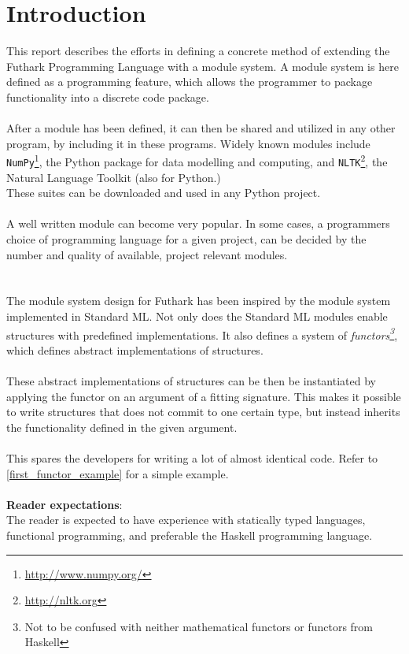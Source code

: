 \section{Introduction}
\label{sec:introduction}
This report describes the efforts in defining a concrete method of extending the Futhark Programming Language with a module system.
A module system is here defined as a programming feature,
which allows the programmer to package functionality into a discrete code
package.
\\\\
After a module has been defined, it can then be shared and utilized in any other
program, by including it in these programs. Widely known modules include
\texttt{NumPy}\footnote{\url{http://www.numpy.org/}}, the Python package for
data modelling and computing, and \texttt{NLTK}\footnote{\url{http://nltk.org}},
the Natural Language Toolkit (also for Python.)
\\
These suites can be downloaded and used in any Python project.
\\
\\
A well written module can become very popular. In some cases, a programmers
choice of programming language for a given project, can be decided by the number and quality of
available, project relevant modules.
\\
\\
\\
The module system design for Futhark has been inspired by the module system
implemented in Standard ML\cite{crash_course}. Not only does the Standard ML
modules enable structures with predefined implementations.
It also defines a system of \textit{functors\footnote{Not to be confused with neither mathematical
  functors or functors from Haskell}}, which defines abstract implementations of
structures.
\\
\\
These abstract implementations of structures can be then be instantiated by
applying the functor on an argument of a fitting signature.
This makes it
possible to write structures that does not commit to one certain type, but
instead inherits the functionality defined in the given argument.
\\
\\
This spares the developers for writing a lot of almost identical code. Refer to
\ref{first_functor_example} for a simple example.
\\
\\
\textbf{Reader expectations}:\\
The reader is expected to have experience with statically typed languages,
functional programming, and preferable the Haskell programming language.

